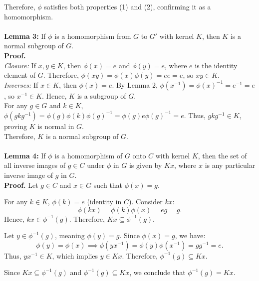 Therefore, \( \phi \) satisfies both properties (1) and (2), confirming it as a homomorphism.
\\\\
\textbf{Lemma 3:} If \( \phi \) is a homomorphism from \( G \) to \( G' \) with kernel \( K \), then \( K \) is a normal subgroup of \( G \).
\\
\textbf{Proof.}
\\
   \textit{Closure:} If \( x, y \in K \), then \( \phi(x) = e \) and \( \phi(y) = e \), where \( e \) is the identity element of \( G \). Therefore, \( \phi(xy) = \phi(x)\phi(y) = ee = e \), so \( xy \in K \).
\\ 
   \textit{Inverses:} If \( x \in K \), then \( \phi(x) = e \). By Lemma 2, \( \phi(x^{-1}) = \phi(x)^{-1} = e^{-1} = e \), so \( x^{-1} \in K \). Hence, \( K \) is a subgroup of \( G \).  
\\   
   For any \( g \in G \) and \( k \in K \), \( \phi(gkg^{-1}) = \phi(g)\phi(k)\phi(g)^{-1} = \phi(g)e\phi(g)^{-1} = e \). Thus, \( gkg^{-1} \in K \), proving \( K \) is normal in \( G \).\\
Therefore, \( K \) is a normal subgroup of \( G \).
\\\\
\textbf{Lemma 4:} If \( \phi \) is a homomorphism of \( G \) onto \( C \) with kernel \( K \), then the set of all inverse images of \( g \in C \) under \( \phi \) in \( G \) is given by \( Kx \), where \( x \) is any particular inverse image of \( g \) in \( G \).
\\
\textbf{Proof.}
Let \( g \in C \) and \( x \in G \) such that \( \phi(x) = g \).

   For any \( k \in K \), \( \phi(k) = e \) (identity in \( C \)). Consider \( kx \):
   \[
   \phi(kx) = \phi(k)\phi(x) = eg = g.
   \]
   Hence, \( kx \in \phi^{-1}(g) \). Therefore, \( Kx \subseteq \phi^{-1}(g) \).

   Let \( y \in \phi^{-1}(g) \), meaning \( \phi(y) = g \). Since \( \phi(x) = g \), we have:
   \[
   \phi(y) = \phi(x) \implies \phi(yx^{-1}) = \phi(y)\phi(x^{-1}) = g g^{-1} = e.
   \]
   Thus, \( yx^{-1} \in K \), which implies \( y \in Kx \). Therefore, \( \phi^{-1}(g) \subseteq Kx \).

Since \( Kx \subseteq \phi^{-1}(g) \) and \( \phi^{-1}(g) \subseteq Kx \), we conclude that \( \phi^{-1}(g) = Kx \).

